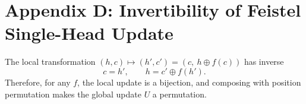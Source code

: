 \section{Appendix D: Invertibility of Feistel Single-Head Update}

The local transformation $(h,c)\mapsto(h',c')=(c,\ h\oplus f(c))$ has inverse
\[
c=h',\qquad h=c'\oplus f(h').
\]
Therefore, for any $f$, the local update is a bijection, and composing with position permutation makes the global update $U$ a permutation.

